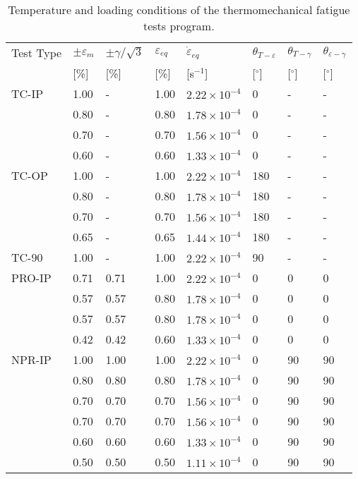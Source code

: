 \begin{table}[htbp]
  \centering
  \caption{Temperature and loading conditions of the thermomechanical fatigue tests program.}
    \begin{tabular}{p{2cm}p{1.5cm}p{1.5cm}p{1.5cm}p{2.5cm}p{1cm}p{1cm}p{1cm}}
    \toprule
    Test Type & $\pm \varepsilon _m$ & $\pm \gamma/ \sqrt 3$ & $\varepsilon _{eq}$ & $\dot \varepsilon _{eq}$ & $\theta_{T-\varepsilon}$ & $\theta_{T-\gamma}$ & $\theta_{\varepsilon-\gamma}$ \\
          & [\%]  & [\%]  & [\%]  & [s$^{-1}$] & [$^\circ$] & [$^\circ$] & [$^\circ$] \\
    \midrule
    TC-IP & 1.00  & -     & 1.00  & $2.22\times 10^{-4}$ & 0     & -     & - \\
          & 0.80  & -     & 0.80  & $1.78\times 10^{-4}$ & 0     & -     & - \\
          & 0.70  & -     & 0.70  & $1.56\times 10^{-4}$ & 0     & -     & - \\
          & 0.60  & -     & 0.60  & $1.33\times 10^{-4}$ & 0     & -     & - \\
    \midrule
    TC-OP & 1.00  & -     & 1.00  & $2.22\times 10^{-4}$ & 180   & -     & - \\
          & 0.80  & -     & 0.80  & $1.78\times 10^{-4}$ & 180   & -     & - \\
          & 0.70  & -     & 0.70  & $1.56\times 10^{-4}$ & 180   & -     & - \\
          & 0.65  & -     & 0.65  & $1.44\times 10^{-4}$ & 180   & -     & - \\
    \midrule
    TC-90 & 1.00  & -     & 1.00  & $2.22\times 10^{-4}$ & 90    & -     & - \\
    \midrule
    PRO-IP & 0.71  & 0.71  & 1.00  & $2.22\times 10^{-4}$ & 0     & 0     & 0 \\
          & 0.57  & 0.57  & 0.80  & $1.78\times 10^{-4}$ & 0     & 0     & 0 \\
          & 0.57  & 0.57  & 0.80  & $1.78\times 10^{-4}$ & 0     & 0     & 0 \\
          & 0.42  & 0.42  & 0.60  & $1.33\times 10^{-4}$ & 0     & 0     & 0 \\
    \midrule
    NPR-IP & 1.00  & 1.00  & 1.00  & $2.22\times 10^{-4}$ & 0     & 90    & 90 \\
          & 0.80  & 0.80  & 0.80  & $1.78\times 10^{-4}$ & 0     & 90    & 90 \\
          & 0.70  & 0.70  & 0.70  & $1.56\times 10^{-4}$ & 0     & 90    & 90 \\
          & 0.70  & 0.70  & 0.70  & $1.56\times 10^{-4}$ & 0     & 90    & 90 \\
          & 0.60  & 0.60  & 0.60  & $1.33\times 10^{-4}$ & 0     & 90    & 90 \\
          & 0.50  & 0.50  & 0.50  & $1.11\times 10^{-4}$ & 0     & 90    & 90 \\
    \bottomrule
    \end{tabular}%
  \label{tab:test_program_tmf}%
\end{table}%

